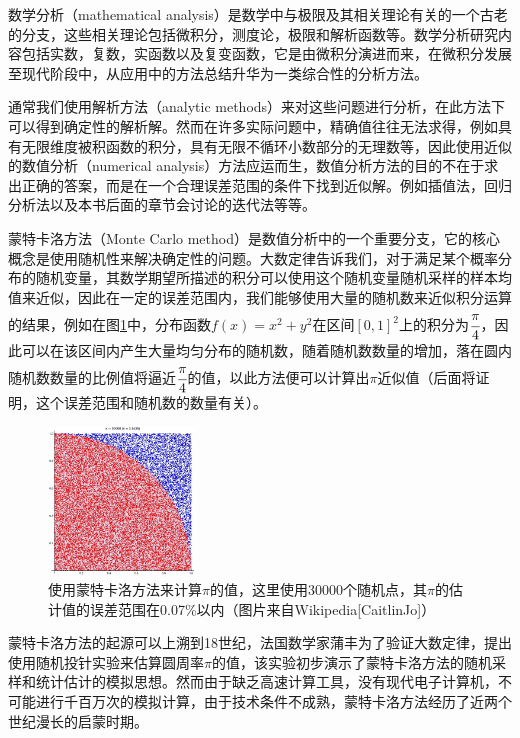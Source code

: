 数学分析（mathematical analysis）是数学中与极限及其相关理论有关的一个古老的分支，这些相关理论包括微积分，测度论，极限和解析函数等。数学分析研究内容包括实数，复数，实函数以及复变函数，它是由微积分演进而来，在微积分发展至现代阶段中，从应用中的方法总结升华为一类综合性的分析方法。

通常我们使用解析方法（analytic methods）来对这些问题进行分析，在此方法下可以得到确定性的解析解。然而在许多实际问题中，精确值往往无法求得，例如具有无限维度被积函数的积分，具有无限不循环小数部分的无理数等，因此使用近似的数值分析（numerical analysis）方法应运而生，数值分析方法的目的不在于求出正确的答案，而是在一个合理误差范围的条件下找到近似解。例如插值法，回归分析法以及本书后面的章节会讨论的迭代法等等。

蒙特卡洛方法（Monte Carlo method）是数值分析中的一个重要分支，它的核心概念是使用随机性来解决确定性的问题。大数定律告诉我们，对于满足某个概率分布的随机变量，其数学期望所描述的积分可以使用这个随机变量随机采样的样本均值来近似，因此在一定的误差范围内，我们能够使用大量的随机数来近似积分运算的结果，例如在图\ref{f:mc-pi}中，分布函数$f(x)=x^2+y^2$在区间$[0,1]^2$上的积分为$ \cfrac{\pi}{4}$，因此可以在该区间内产生大量均匀分布的随机数，随着随机数数量的增加，落在圆内随机数数量的比例值将逼近$ \cfrac{\pi}{4}$的值，以此方法便可以计算出$\pi$近似值（后面将证明，这个误差范围和随机数的数量有关）。

\begin{figure}
	\sidecaption
	\includegraphics[width=0.35\textwidth]{figures/mc/pi}
	\caption{使用蒙特卡洛方法来计算$\pi$的值，这里使用30000个随机点，其$\pi$的估计值的误差范围在0.07\%以内（图片来自Wikipedia[CaitlinJo]）}
	\label{f:mc-pi}
\end{figure}

蒙特卡洛方法的起源可以上溯到18世纪，法国数学家蒲丰为了验证大数定律，提出使用随机投针实验来估算圆周率$\pi$的值，该实验初步演示了蒙特卡洛方法的随机采样和统计估计的模拟思想。然而由于缺乏高速计算工具，没有现代电子计算机，不可能进行千百万次的模拟计算，由于技术条件不成熟，蒙特卡洛方法经历了近两个世纪漫长的启蒙时期。

